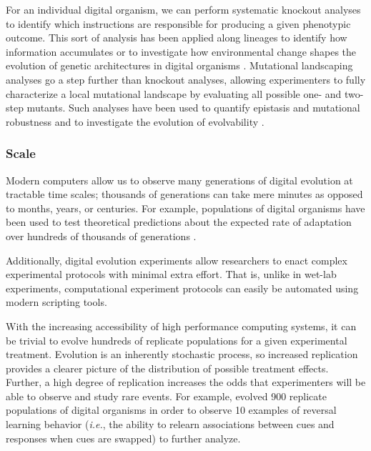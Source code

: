 
For an individual digital organism, we can perform systematic knockout analyses to identify which instructions are responsible for producing a given phenotypic outcome.
This sort of analysis has been applied along lineages to identify how information accumulates \citep{ofria_gradual_2008} or to investigate how environmental change shapes the evolution of genetic architectures in digital organisms \citep{canino-koning_evolution_2016}.
Mutational landscaping analyses go a step further than knockout analyses, allowing experimenters to fully characterize a local mutational landscape by evaluating all possible one- and two-step mutants.
Such analyses have been used to quantify epistasis \citep{lenski_genome_1999} and mutational robustness \citep{elena_effects_2007} and to investigate the evolution of evolvability \citep{canino-koning_fluctuating_2019}. 

\subsubsection{Scale}

Modern computers allow us to observe many generations of digital evolution at tractable time scales; thousands of generations can take mere minutes as opposed to months, years, or centuries.
For example, populations of digital organisms have been used to test theoretical predictions about the expected rate of adaptation over hundreds of thousands of generations \citep{wiser_analysis_2015,wiser_boundedness_2018}.

Additionally, digital evolution experiments allow researchers to enact complex experimental protocols with minimal extra effort. 
That is, unlike in wet-lab experiments, computational experiment protocols can easily be automated using modern scripting tools. %

With the increasing accessibility of high performance computing systems, it can be trivial to evolve hundreds of replicate populations for a given experimental treatment. 
Evolution is an inherently stochastic process, so increased replication provides a clearer picture of the distribution of possible treatment effects. 
Further, a high degree of replication increases the odds that experimenters will be able to observe and study rare events. %
For example, \cite{pontes_evolutionary_2020} evolved 900 replicate populations of digital organisms in order to observe 10 examples of reversal learning behavior (\textit{i.e.}, the ability to relearn associations between cues and responses when cues are swapped) to further analyze.

